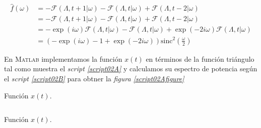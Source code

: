 \documentclass[a4paper,12pt,final]{article}
\begin{document}
        \begin{equation*}
          \begin{split}
            \widehat{f}\left(\omega\right) & = - \mathcal{F}\left(\Lambda,t + 1|\omega\right) - \mathcal{F}\left(\Lambda,t|\omega\right) + \mathcal{F}\left(\Lambda,t - 2|\omega\right) \\
                                           & = - \mathcal{F}\left(\Lambda,t + 1|\omega\right) - \mathcal{F}\left(\Lambda,t|\omega\right) + \mathcal{F}\left(\Lambda,t - 2|\omega\right) \\
                                           & = - \exp\left(i \omega\right) \mathcal{F}\left(\Lambda,t|\omega\right) - \mathcal{F}\left(\Lambda,t|\omega\right) + \exp\left(- 2 i \omega\right) \mathcal{F}\left(\Lambda,t|\omega\right) \\
                                           & = \left( - \exp\left(i \omega\right) - 1 + \exp\left(- 2 i \omega\right) \right) \mathrm{sinc}^{2}\left(\frac{\omega}{2}\right)
          \end{split}
        \end{equation*}

      \noindent En \textsc{Matlab} implementamos la función $x\left(t\right)$
        en términos de la función triángulo tal como muestra el \emph{script
        \ref{script02A}} y calculamos su espectro de potencia según el
        \emph{script \ref{script02B}} para obtner la \emph{figura
        \ref{script02Afigure}}

        \begin{listing}[H]
          \caption{Función $x\left(t\right)$.}
          \label{script02A}
          \inputminted{matlab}{./laboratorio_4/p2_x.m}
        \end{listing}

        \begin{listing}[H]
          \caption{Función $x\left(t\right)$.}
          \label{script02B}
          \inputminted{matlab}{./laboratorio_4/problema02.m}
        \end{listing}
\end{document}
